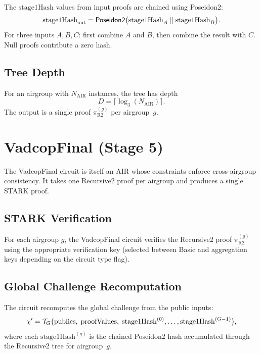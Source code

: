 The $\mathrm{stage1Hash}$ values from input proofs are chained
using Poseidon2:
\[
  \mathrm{stage1Hash}_{\mathrm{out}}
  = \textsf{Poseidon2}\bigl(\mathrm{stage1Hash}_A \;\|\; \mathrm{stage1Hash}_B\bigr).
\]
For three inputs $A, B, C$:
first combine $A$ and $B$, then combine the result with $C$.
Null proofs contribute a zero hash.

\subsection{Tree Depth}
\label{sec:r2-depth}

For an airgroup with $N_{\mathrm{AIR}}$ instances, the tree has depth
\[
  D = \lceil \log_3(N_{\mathrm{AIR}}) \rceil.
\]
The output is a single proof $\pi^{(g)}_{\mathrm{R2}}$ per airgroup~$g$.

\section{VadcopFinal (Stage 5)}
\label{sec:vadcop-final}

The VadcopFinal circuit is itself an AIR whose constraints enforce
cross-airgroup consistency.
It takes one Recursive2 proof per airgroup and produces a single STARK proof.

\subsection{STARK Verification}
\label{sec:vf-stark}

For each airgroup $g$, the VadcopFinal circuit verifies the Recursive2 proof
$\pi^{(g)}_{\mathrm{R2}}$
using the appropriate verification key
(selected between Basic and aggregation keys
depending on the circuit type flag).

\subsection{Global Challenge Recomputation}
\label{sec:vf-challenge}

The circuit recomputes the global challenge from the public inputs:
\[
  \chi' = \mathcal{T}_G\bigl(\mathrm{publics},\;
                    \mathrm{proofValues},\;
                    \mathrm{stage1Hash}^{(0)}, \ldots,
                    \mathrm{stage1Hash}^{(G-1)}\bigr),
\]
where each $\mathrm{stage1Hash}^{(g)}$ is the chained Poseidon2 hash
accumulated through the Recursive2 tree for airgroup~$g$.

